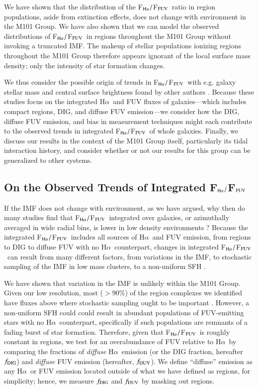 \documentclass[iop]{emulateapj}
\newcommand{\ha}{H$\alpha$}
\newcommand{\hafuv}{F$_{\rm H\alpha}/$F$_{\rm FUV}$}
\begin{document}
We have shown that the distribution of the \hafuv \ ratio in
 region populations, aside from extinction effects, does not
change with environment in the M101 Group.  We have also shown that we
can model the observed distributions of \hafuv \ in  regions
throughout the M101 Group without invoking a truncated IMF.  The
makeup of stellar populations ionizing  regions throughout
the M101 Group therefore appears ignorant of the local surface mass
density; only the intensity of star formation changes.

We thus consider the possible origin of trends in \hafuv \ with
e.g. galaxy stellar mass and central surface brightness found by other
authors \citep[e.g.][]{lee09, meurer09}.  Because these studies focus
on the integrated \ha \ and FUV fluxes of galaxies---which includes
compact  regions, DIG, and diffuse FUV emission---we
consider how the DIG, diffuse FUV emission, and bias in measurement
techniques might each contribute to the observed trends in integrated
\hafuv \ of whole galaxies.  Finally, we discuss our results in the
context of the M101 Group itself, particularly its tidal interaction
history, and consider whether or not our results for this group can be
generalized to other systems.


\subsection{On the Observed Trends of Integrated \hafuv}

If the IMF does not change with environment, as we have argued, why
then do many studies find that \hafuv \ integrated over galaxies, or
azimuthally averaged in wide radial bins, is lower in low density
environments \citep[e.g.][]{gildepaz05, thilker05, lee09, meurer09,
  goddard10}?  Because the integrated \hafuv \ includes all sources of
\ha \ and FUV emission, from  regions to DIG to diffuse FUV
with no \ha \ counterpart, changes in integrated \hafuv \ can result
from many different factors, from variations in the IMF, to stochastic
sampling of the IMF in low mass clusters, to a non-uniform SFH
\citep[e.g.][]{lee09, pflamm09, alberts11, barnes11, barnes13,
  weisz12, dasilva14}.

We have shown that variation in the IMF is unlikely within the M101
Group.  Given our low resolution, most ($>$90\%) of the 
region complexes we identified have fluxes above where stochastic
sampling ought to be important \citep[e.g.][]{hermanowicz13}.
However, a non-uniform SFH could could result in abundant
populations of FUV-emitting stars with no \ha \ counterpart,
specifically if such populations are remnants of a fading burst of
star formation.  Therefore, given that \hafuv \ is roughly constant in
 regions, we test for an overabundance of FUV
relative to \ha \ by comparing the fractions of \emph{diffuse} \ha \ emission
(or the DIG fraction, hereafter $f_{\rm DIG}$) and \emph{diffuse} FUV
emission (hereafter, $f_{\rm DUV}$).  We define ``diffuse'' emission
as any \ha \ or FUV emission located outside of what we have defined
as  regions, for simplicity; hence, we measure $f_{\rm DIG}$
and $f_{\rm DUV}$ by masking out  regions.
\end{document}
